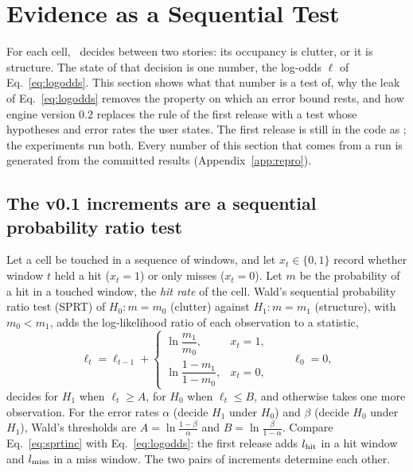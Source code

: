 \section{Evidence as a Sequential Test}\label{sec:seq}

For each cell, \sname\ decides between two stories: its occupancy is clutter, or it is structure. The state of that decision is one number, the log-odds $\ell$ of Eq.~\eqref{eq:logodds}. This section shows what that number is a test of, why the leak of Eq.~\eqref{eq:logodds} removes the property on which an error bound rests, and how engine version 0.2 replaces the rule of the first release with a test whose hypotheses and error rates the user states. The first release is still in the code as ; the experiments run both. Every number of this section that comes from a run is generated from the committed results (Appendix~\ref{app:repro}).

\subsection{The v0.1 increments are a sequential probability ratio test}\label{subsec:seqv01}

Let a cell be touched in a sequence of windows, and let $x_t\in\{0,1\}$ record whether window $t$ held a hit ($x_t=1$) or only misses ($x_t=0$). Let $m$ be the probability of a hit in a touched window, the \emph{hit rate} of the cell. Wald's sequential probability ratio test (SPRT) \citep{wald1947sequential} of $H_0\!:m=m_0$ (clutter) against $H_1\!:m=m_1$ (structure), with $m_0<m_1$, adds the log-likelihood ratio of each observation to a statistic,
\begin{equation}\label{eq:sprtinc}
  \ell_t=\ell_{t-1}+\begin{cases}\ln\dfrac{m_1}{m_0}, & x_t=1,\\[4pt] \ln\dfrac{1-m_1}{1-m_0}, & x_t=0,\end{cases}\qquad \ell_0=0,
\end{equation}
decides for $H_1$ when $\ell_t\ge A$, for $H_0$ when $\ell_t\le B$, and otherwise takes one more observation. For the error rates $\alpha$ (decide $H_1$ under $H_0$) and $\beta$ (decide $H_0$ under $H_1$), Wald's thresholds are $A=\ln\frac{1-\beta}{\alpha}$ and $B=\ln\frac{\beta}{1-\alpha}$. Compare Eq.~\eqref{eq:sprtinc} with Eq.~\eqref{eq:logodds}: the first release adds $l_{\mathrm{hit}}$ in a hit window and $l_{\mathrm{miss}}$ in a miss window. The two pairs of increments determine each other.

